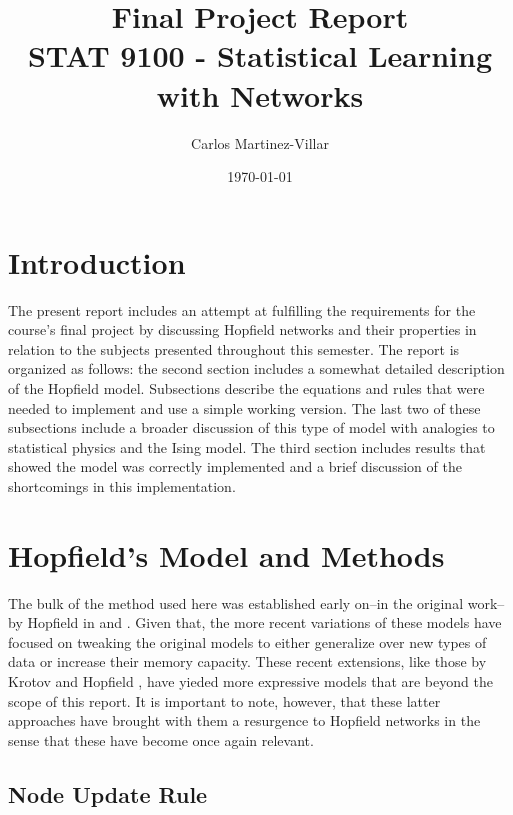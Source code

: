 \documentclass{article}
\title{Final Project Report\\STAT 9100 - Statistical Learning with Networks}
\author{Carlos Martinez-Villar}
\date{\today}
\begin{document}
	
	\section{Introduction}
	The present report includes an attempt at fulfilling the requirements for the course's final project by discussing Hopfield networks and their properties in relation to the subjects presented throughout this semester. 
	The report is organized as follows: the second section includes a somewhat detailed description of the Hopfield model. Subsections describe the equations and rules that were needed to implement and use a simple working version. The last two of these subsections include a broader discussion of this type of model with analogies to statistical physics and the Ising model. The third section includes results that showed the model was correctly implemented and a brief discussion of the shortcomings in this implementation. 
	
	\section{Hopfield's Model and Methods}
	
	The bulk of the method used here was established early on–in the original work–by Hopfield in \cite{hopfield1982neural}  and \cite{hopfield1984neurons}. Given that, the more recent variations of these models have focused on tweaking the original models to either generalize over new types of data or increase their memory capacity. These recent extensions, like those by Krotov and Hopfield \cite{krotov2016dense}, have yieded more expressive models that are beyond the scope of this report. It is important to note, however, that these latter approaches have brought with them a resurgence to Hopfield networks in the sense that these have become once again relevant. \\
	\cite{hebb2005organization}
	\cite{mackay2003information}
	
	\subsection{Node Update Rule}
	
\end{document}
